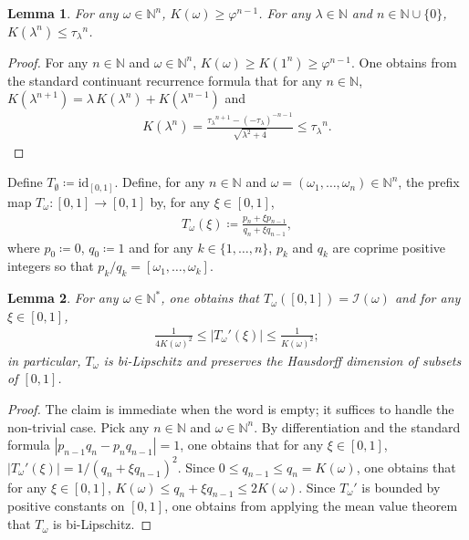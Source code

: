 \documentclass[10pt,a4paper]{amsart}
\newtheorem{lemma}{Lemma}
\begin{document}
\begin{lemma}
\label{lem:continuant-growth}
For any $\omega\in\mathbb{N}^n$, $K(\omega)\geq \varphi^{n-1}$. For any $\lambda\in\mathbb{N}$ and $n\in\mathbb{N}\cup\{0\}$, $K(\lambda^n)\leq {\tau_\lambda}^n$.
\end{lemma}
\begin{proof}
For any $n\in\mathbb{N}$ and $\omega\in\mathbb{N}^n$, $K(\omega)\geq K(1^n)\geq \varphi^{n-1}$. One obtains from the standard continuant recurrence formula that for any $n\in\mathbb{N}$, $K(\lambda^{n+1})=\lambda\,K(\lambda^n)+K(\lambda^{n-1})$ and 
\begin{align*}
    K(\lambda^n)
    =\frac{{\tau_\lambda}^{n+1}-(-\tau_\lambda)^{-n-1}}{\sqrt{\lambda^2+4}}
    \leq{\tau_\lambda}^n.
\end{align*}
\end{proof}
Define $T_{\emptyset}\coloneqq\mathrm{id}_{[0,1]}$. Define, for any $n\in\mathbb{N}$ and $\omega=(\omega_1,\ldots,\omega_n)\in\mathbb{N}^n$, the prefix map $T_\omega:[0,1]\to[0,1]$ by, for any $\xi\in[0,1]$,
\begin{align*}
    T_\omega(\xi)\coloneqq \frac{p_n+\xi p_{n-1}}{q_n+\xi q_{n-1}},
\end{align*}
where $p_0\coloneqq0$, $q_0\coloneqq 1$ and for any $k\in\{1,\ldots,n\}$, $p_k$ and $q_k$ are coprime positive integers so that $p_k/q_k=[\omega_1,\ldots,\omega_k]$. 

\begin{lemma}
\label{lem:prefix-map-derivative}
For any $\omega\in\mathbb{N}^*$, one obtains that $T_\omega([0,1])=\mathcal{I}(\omega)$ and for any $\xi\in[0,1]$, 
\begin{align*}
    \frac{1}{4K(\omega)^2}
    \leq\left|T_\omega'(\xi)\right|
    \leq\frac{1}{K(\omega)^2};
\end{align*}
in particular, $T_\omega$ is bi-Lipschitz and preserves the Hausdorff dimension of subsets of $[0,1]$.
\end{lemma}
\begin{proof}
The claim is immediate when the word is empty; it suffices to handle the non-trivial case. Pick any $n\in\mathbb{N}$ and $\omega\in\mathbb{N}^n$. By differentiation and the standard formula $|p_{n-1}q_n-p_nq_{n-1}|=1$, one obtains that for any $\xi\in[0,1]$, $\left|T_\omega'(\xi)\right|=1/(q_n+\xi q_{n-1})^2$. Since $0\leq q_{n-1}\leq q_n=K(\omega)$, one obtains that for any $\xi\in[0,1]$, $K(\omega)\leq q_n+\xi q_{n-1}\leq 2K(\omega)$. Since $T_\omega'$ is bounded by positive constants on $[0,1]$, one obtains from applying the mean value theorem that $T_\omega$ is bi-Lipschitz.
\end{proof}
\end{document}

